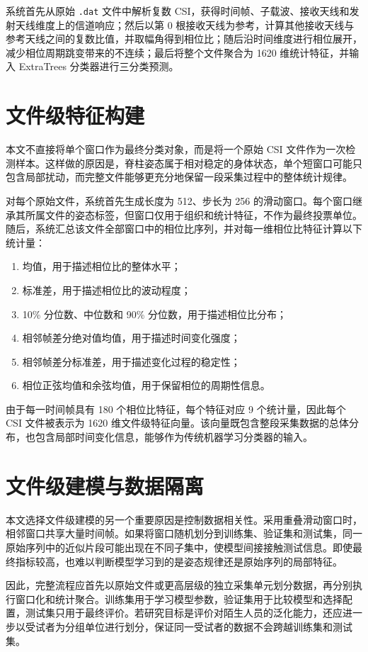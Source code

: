 系统首先从原始 \texttt{.dat} 文件中解析复数 CSI，获得时间帧、子载波、接收天线和发射天线维度上的信道响应；然后以第 0 根接收天线为参考，计算其他接收天线与参考天线之间的复数比值，并取幅角得到相位比；随后沿时间维度进行相位展开，减少相位周期跳变带来的不连续；最后将整个文件聚合为 1620 维统计特征，并输入 ExtraTrees 分类器进行三分类预测。

\section{文件级特征构建}
本文不直接将单个窗口作为最终分类对象，而是将一个原始 CSI 文件作为一次检测样本。这样做的原因是，脊柱姿态属于相对稳定的身体状态，单个短窗口可能只包含局部扰动，而完整文件能够更充分地保留一段采集过程中的整体统计规律。

对每个原始文件，系统首先生成长度为 512、步长为 256 的滑动窗口。每个窗口继承其所属文件的姿态标签，但窗口仅用于组织和统计特征，不作为最终投票单位。随后，系统汇总该文件全部窗口中的相位比序列，并对每一维相位比特征计算以下统计量：
\begin{enumerate}
\item 均值，用于描述相位比的整体水平；
\item 标准差，用于描述相位比的波动程度；
\item 10\% 分位数、中位数和 90\% 分位数，用于描述相位比分布；
\item 相邻帧差分绝对值均值，用于描述时间变化强度；
\item 相邻帧差分标准差，用于描述变化过程的稳定性；
\item 相位正弦均值和余弦均值，用于保留相位的周期性信息。
\end{enumerate}

由于每一时间帧具有 180 个相位比特征，每个特征对应 9 个统计量，因此每个 CSI 文件被表示为 1620 维文件级特征向量。该向量既包含整段采集数据的总体分布，也包含局部时间变化信息，能够作为传统机器学习分类器的输入。

\section{文件级建模与数据隔离}
本文选择文件级建模的另一个重要原因是控制数据相关性。采用重叠滑动窗口时，相邻窗口共享大量时间帧。如果将窗口随机划分到训练集、验证集和测试集，同一原始序列中的近似片段可能出现在不同子集中，使模型间接接触测试信息。即使最终指标较高，也难以判断模型学习到的是姿态规律还是原始序列的局部特征。

因此，完整流程应首先以原始文件或更高层级的独立采集单元划分数据，再分别执行窗口化和统计聚合。训练集用于学习模型参数，验证集用于比较模型和选择配置，测试集只用于最终评价。若研究目标是评价对陌生人员的泛化能力，还应进一步以受试者为分组单位进行划分，保证同一受试者的数据不会跨越训练集和测试集。

